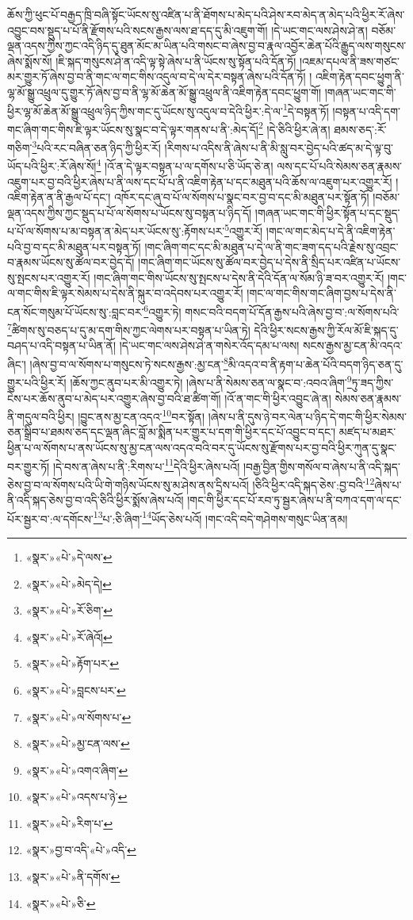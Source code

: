 ཆོས་ཀྱི་ཕུང་པོ་བརྒྱད་ཁྲི་བཞི་སྟོང་ཡོངས་སུ་འཛིན་པ་ནི་ཐོགས་པ་མེད་པའི་ཤེས་རབ་མེད་ན་མེད་པའི་ཕྱིར་རོ་ཞེས་འབྱུང་བས་སྡུད་པ་པོ་ནི་རྫོགས་པའི་སངས་རྒྱས་ལས་ཐ་དད་དུ་མི་འཇུག་གོ། །དེ་ཡང་གང་ལས་ཤེས་ཤེ་ན། བཅོམ་ལྡན་འདས་ཀྱིས་ཀྱང་འདི་ཉིད་དུ་ཐུན་མོང་མ་ཡིན་པའི་གསང་བ་ཞེས་བྱ་བ་རྣལ་འབྱོར་ཆེན་པོའི་རྒྱུད་ལས་གསུངས་ཞེས་སྨོས་སོ། །ཇི་སྐད་གསུངས་ཤེ་ན་འདི་ལྟ་སྟེ་ཞེས་པ་ནི་ཡོངས་སུ་སྟོན་པའི་དོན་ཏོ། །འཇམ་དཔལ་ནི་ཟས་གཙང་མར་གྱུར་ཏོ་ཞེས་བྱ་བ་ནི་གང་ལ་གང་གིས་འདུལ་བ་དེ་ལ་དེར་བསྟན་ཞེས་པའི་དོན་ཏོ། །
འཇིག་རྟེན་དབང་ཕྱུག་ནི་ལྷ་མོ་སྒྱུ་འཕྲུལ་དུ་གྱུར་ཏོ་ཞེས་བྱ་བ་ནི་ལྷ་མོ་ཆེན་མོ་སྒྱུ་འཕྲུལ་ནི་འཇིག་རྟེན་དབང་ཕྱུག་གོ། །གཞན་ཡང་གང་གི་ཕྱིར་ལྷ་མོ་ཆེན་མོ་སྒྱུ་འཕྲུལ་ཉིད་ཀྱིས་གང་དུ་ཡོངས་སུ་འདུལ་བ་དེའི་ཕྱིར་:དེ་ལ་\footnote{«སྣར་»«པེ་»དེ་ལས་}དེ་བསྟན་ཏོ། །བསྟན་པ་འདི་དག་གང་ཞིག་གང་གིས་ཇི་ལྟར་ཡོངས་སུ་སྣང་བ་དེ་ལྟར་གནས་པ་ནི་:མེད་དོ།\footnote{«སྣར་»«པེ་»མེད་དེ།} །དེ་ཅིའི་ཕྱིར་ཞེ་ན། ཐམས་ཅད་:རོ་གཅིག་\footnote{«སྣར་»«པེ་»རོ་ཅིག་}པའི་རང་བཞིན་ཅན་ཉིད་ཀྱི་ཕྱིར་རོ། །རིགས་པ་འདིས་ནི་ཞེས་པ་ནི་མི་སླུ་བར་བྱེད་པའི་ཚད་མ་དེ་ལྟ་བུ་ཡོད་པའི་ཕྱིར་:རོ་ཞེས་སོ།\footnote{«སྣར་»«པེ་»རོ་ཞེའོ།} །འོ་ན་དེ་ལྟར་བསྟན་པ་ལ་དགོས་པ་ཅི་ཡོད་ཅེ་ན། ལས་དང་པོ་པའི་སེམས་ཅན་རྣམས་འཇུག་པར་བྱ་བའི་ཕྱིར་ཞེས་པ་ནི་ལས་དང་པོ་པ་ནི་འཇིག་རྟེན་པ་དང་མཐུན་པའི་ཆོས་ལ་འཇུག་པར་འགྱུར་རོ། །འཇིག་རྟེན་ན་ནི་རྒྱལ་པོ་དང་། འཁོར་དང་ཞུ་བ་པོ་ལ་སོགས་པ་སྣང་བར་བྱ་བ་དང་མི་མཐུན་པར་སྟོན་ཏོ། །བཅོམ་ལྡན་འདས་ཀྱིས་ཀྱང་སྡུད་པ་པོ་ལ་སོགས་པ་ཡོངས་སུ་བསྟན་པ་ཉིད་དོ། །གཞན་ཡང་གང་གི་ཕྱིར་སྟོན་པ་དང་སྡུད་པ་པོ་ལ་སོགས་པ་མ་བསྟན་ན་མེད་པར་ཡོངས་སུ་:རྟོགས་པར་\footnote{«སྣར་»«པེ་»རྟོག་པར་}འགྱུར་རོ། །གང་ལ་གང་མེད་པ་དེ་ནི་འཇིག་རྟེན་པའི་བྱ་བ་དང་མི་མཐུན་པར་བསྟན་ཏོ། །གང་ཞིག་གང་དང་མི་མཐུན་པ་དེ་ལ་ནི་གང་ཟག་དད་པའི་རྗེས་སུ་འབྲང་བ་རྣམས་ཡོངས་སུ་ཚོལ་བར་བྱེད་དོ། །གང་ཞིག་གང་ཡོངས་སུ་ཚོལ་བར་བྱེད་པ་དེས་ནི་སྲིད་པར་འཛིན་པ་ཡོངས་སུ་སྤངས་པར་འགྱུར་རོ། །གང་ཞིག་གང་གིས་ཡོངས་སུ་སྤངས་པ་དེས་ནི་དེའི་དོན་ལ་སོམ་ཉི་ཟ་བར་འགྱུར་རོ། །གང་ལ་གང་གིས་ཇི་ལྟར་སེམས་པ་དེས་ནི་སྐུར་བ་འདེབས་པར་འགྱུར་རོ། །གང་ལ་གང་གིས་གང་ཞིག་བྱས་པ་དེས་ནི་ངན་སོང་གསུམ་པོ་ཡོངས་སུ་:བླང་བར་\footnote{«སྣར་»«པེ་»བླངས་པར་}འགྱུར་ཏེ། གསང་བའི་བདག་པོ་དོན་རྒྱས་པའི་ཞེས་བྱ་བ་:ལ་སོགས་པའི་\footnote{«སྣར་»«པེ་»ལ་སོགས་པ་}ཚིགས་སུ་བཅད་པ་དུ་མ་དག་གིས་ཀྱང་ལེགས་པར་བསྟན་པ་ཡིན་ཏེ། དེའི་ཕྱིར་སངས་རྒྱས་ཀྱི་རོལ་མོ་ཇི་སྐད་དུ་བཤད་པ་འདི་བསྟན་པ་ཡིན་ནོ། །དེ་ཡང་གང་ལས་ཤེས་ཤེ་ན་གསེར་འོད་དམ་པ་ལས། སངས་རྒྱས་མྱ་ངན་མི་འདའ་ཞིང་། །ཞེས་བྱ་བ་ལ་སོགས་པ་གསུངས་ཏེ་སངས་རྒྱས་:མྱ་ངན་\footnote{«སྣར་»«པེ་»མྱ་ངན་ལས་}མི་འདའ་བ་ནི་རྟག་པ་ཆེན་པོའི་བདག་ཉིད་ཅན་དུ་གྱུར་པའི་ཕྱིར་རོ། །ཆོས་ཀྱང་ནུབ་པར་མི་འགྱུར་ཏེ། །ཞེས་པ་ནི་སེམས་ཅན་ལ་སྣང་བ་:འབའ་ཞིག་\footnote{«སྣར་»«པེ་»འགའ་ཞིག་}ཏུ་ཟད་ཀྱིས་ངེས་པར་ཆོས་ནུབ་པ་མེད་པར་འགྱུར་ཞེས་བྱ་བའི་ཐ་ཚིག་གོ། །འོ་ན་གང་གི་ཕྱིར་འབྱུང་ཞེ་ན། སེམས་ཅན་རྣམས་ནི་གདུལ་བའི་ཕྱིར། །བྱུང་ནས་མྱ་ངན་འདའ་\footnote{«སྣར་»«པེ་»འདས་པ་ཉེ་}བར་སྟོན། །ཞེས་པ་ནི་དུས་ཉེ་བར་ལེན་པ་ཉིད་དེ་གང་གི་ཕྱིར་སེམས་ཅན་སྒྲིབ་པ་ཐམས་ཅད་དང་ལྡན་ཞིང་བློ་མ་སྨིན་པར་གྱུར་པ་དག་གི་ཕྱིར་དང་པོ་འབྱུང་བ་དང་། མཛད་པ་མཐར་ཕྱིན་པ་ལ་སོགས་པ་ནས་ཡོངས་སུ་མྱ་ངན་ལས་འདའ་བའི་བར་དུ་ཡོངས་སུ་རྫོགས་པར་བྱ་བའི་ཕྱིར་ཀུན་དུ་སྣང་བར་གྱུར་ཏོ། །དེ་བས་ན་ཞེས་པ་ནི་:རིགས་པ་\footnote{«སྣར་»«པེ་»རིག་པ་}དེའི་ཕྱིར་ཞེས་པའོ། །བརྒྱ་བྱིན་གྱིས་གསོལ་བ་ཞེས་པ་ནི་འདི་སྐད་ཅེས་བྱ་བ་ལ་སོགས་པའི་ཡི་གེ་གཉིས་ཡོངས་སུ་མ་ཤེས་ནས་དྲིས་པའོ། །ཅིའི་ཕྱིར་འདི་སྐད་ཅེས་:བྱ་བའི་\footnote{«སྣར་»བྱ་བ་འདི་«པེ་»འདི་}ཞེས་པ་ནི་འདི་སྐད་ཅེས་བྱ་བ་འདི་ཅིའི་ཕྱིར་སྨོས་ཞེས་པའོ། །གང་གི་ཕྱིར་དང་པོ་རབ་ཏུ་སྦྱར་ཞེས་པ་ནི་བཀའ་དག་ལ་དང་པོར་སྦྱར་བ་:ལ་དགོངས་\footnote{«སྣར་»«པེ་»ནི་དགོས་}པ་:ཅི་ཞིག་\footnote{«སྣར་»«པེ་»ཅི་}ཡོད་ཅེས་པའོ། །གང་འདི་བདེ་གཤེགས་གསུང་ཡིན་ནམ། 